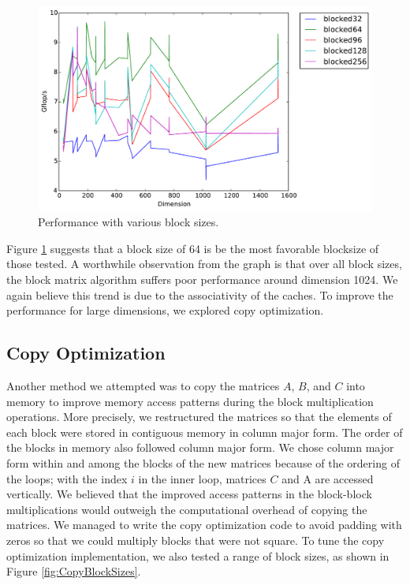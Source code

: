 \documentclass[12pt]{article}
\begin{document}
\begin{center}
\begin{figure}[h]
\includegraphics[width=6in]{timing_blocked_comparison.pdf}
	\caption{Performance with various block sizes.}
	\label{fig:BlockSizes}
\end{figure}
\end{center}

Figure \ref{fig:BlockSizes} suggests that a block size of 64 is be the most favorable blocksize of those tested.
A worthwhile observation from the graph is that over all block sizes, the block matrix algorithm suffers poor performance around dimension 1024.
We again believe this trend is due to the associativity of the caches.
To improve the performance for large dimensions, we explored copy optimization.

\subsection{Copy Optimization}

Another method we attempted was to copy the matrices $A$, $B$, and $C$ into memory to improve memory access patterns during the block multiplication operations.
More precisely, we restructured the matrices so that the elements of each block were stored in contiguous memory in column major form.
The order of the blocks in memory also followed column major form.
We chose column major form within and among the blocks of the new matrices because of the ordering of the loops; with the index $i$ in the inner loop, matrices $C$ and A are accessed vertically.
We believed that the improved access patterns in the block-block multiplications would outweigh the computational overhead of copying the matrices.
We managed to write the copy optimization code to avoid padding with zeros so that we could multiply blocks that were not square.
To tune the copy optimization implementation, we also tested a range of block sizes, as shown in Figure \ref{fig:CopyBlockSizes}.  
\end{document}
